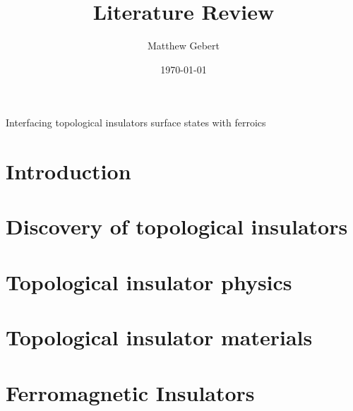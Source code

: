 \documentclass{article} %
\title{Literature Review}
\date{\today}
\author{Matthew Gebert}
\begin{document}
	\maketitle
	\begingroup
	\centering
		\vspace{5mm}\LARGE Interfacing topological insulators surface states with ferroics\\\vspace{1.5cm}	
	\endgroup
	\normalfont\normalsize
		
		
\renewcommand{\baselinestretch}{0.94}\normalsize
\tableofcontents
\renewcommand{\baselinestretch}{1}\normalsize
		
\section{Introduction}


\section{Discovery of topological insulators}


\section{Topological insulator physics}


\section{Topological insulator materials}


%
\section{Ferromagnetic Insulators}

\end{document}

